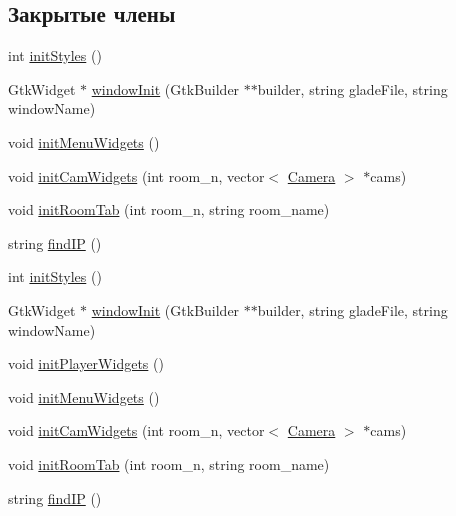 \subsection*{Закрытые члены}
\begin{DoxyCompactItemize}
\item 
int \hyperlink{class_u_i_a2405c93cf8c14f22ebc20de45116e52b}{init\+Styles} ()
\item 
Gtk\+Widget $\ast$ \hyperlink{class_u_i_ad6b4d1f070f96f4a8cd7919595b2f9a7}{window\+Init} (Gtk\+Builder $\ast$$\ast$builder, string glade\+File, string window\+Name)
\item 
void \hyperlink{class_u_i_ac1d0ed7af2a3272527c544110fc37890}{init\+Menu\+Widgets} ()
\item 
void \hyperlink{class_u_i_abc8966cc08826d39716b86e0a160af24}{init\+Cam\+Widgets} (int room\+\_\+n, vector$<$ \hyperlink{struct_camera}{Camera} $>$ $\ast$cams)
\item 
void \hyperlink{class_u_i_ab66596071cbc18cb463b8a99266c7926}{init\+Room\+Tab} (int room\+\_\+n, string room\+\_\+name)
\item 
string \hyperlink{class_u_i_aa7991c3483e84d5ed9f64eeb333c9e44}{find\+IP} ()
\item 
int \hyperlink{class_u_i_a2405c93cf8c14f22ebc20de45116e52b}{init\+Styles} ()
\item 
Gtk\+Widget $\ast$ \hyperlink{class_u_i_ad65c4c017205871946a731f015d74f3c}{window\+Init} (Gtk\+Builder $\ast$$\ast$builder, string glade\+File, string window\+Name)
\item 
void \hyperlink{class_u_i_a85a2b2c92c5d2017f50886f7a184ddd1}{init\+Player\+Widgets} ()
\item 
void \hyperlink{class_u_i_ac1d0ed7af2a3272527c544110fc37890}{init\+Menu\+Widgets} ()
\item 
void \hyperlink{class_u_i_abc8966cc08826d39716b86e0a160af24}{init\+Cam\+Widgets} (int room\+\_\+n, vector$<$ \hyperlink{struct_camera}{Camera} $>$ $\ast$cams)
\item 
void \hyperlink{class_u_i_ab66596071cbc18cb463b8a99266c7926}{init\+Room\+Tab} (int room\+\_\+n, string room\+\_\+name)
\item 
string \hyperlink{class_u_i_aa7991c3483e84d5ed9f64eeb333c9e44}{find\+IP} ()
\end{DoxyCompactItemize}
